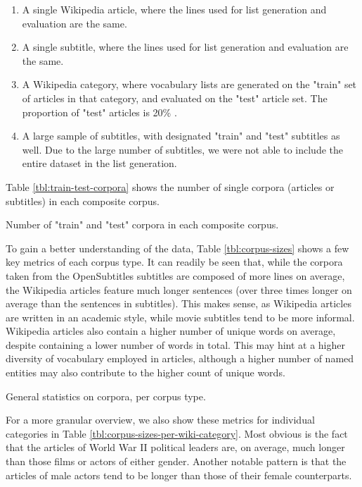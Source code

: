 \begin{enumerate}
	\item A single Wikipedia article, where the lines used for list generation and evaluation are the same.
	\item A single subtitle, where the lines used for list generation and evaluation are the same.
	\item A Wikipedia category, where vocabulary lists are generated on the "train" set of articles in that category, and evaluated on the "test" article set. The proportion of "test" articles is 20\% .
	\item A large sample of subtitles, with designated "train" and "test" subtitles as well. Due to the large number of subtitles, we were not able to include the entire dataset in the list generation.
\end{enumerate}

Table \ref{tbl:train-test-corpora} shows the number of single corpora (articles or subtitles) in each composite corpus.

\begin{table}[ht]
	\centering
	
	\caption{Number of "train" and "test" corpora in each composite corpus.}
	\label{tbl:train-test-corpora}
\end{table}


To gain a better understanding of the data, Table \ref{tbl:corpus-sizes} shows a few key metrics of each corpus type.
It can readily be seen that, while the corpora taken from the OpenSubtitles subtitles are composed of more lines on average, the Wikipedia articles feature much longer sentences (over three times longer on average than the sentences in subtitles).
This makes sense, as Wikipedia articles are written in an academic style, while movie subtitles tend to be more informal.
Wikipedia articles also contain a higher number of unique words on average, despite containing a lower number of words in total.
This may hint at a higher diversity of vocabulary employed in articles, although a higher number of named entities may also contribute to the higher count of unique words.

\begin{table}[ht]
	\centering
	
	\caption{General statistics on corpora, per corpus type.}
	\label{tbl:corpus-sizes}
\end{table}


For a more granular overview, we also show these metrics for individual categories in Table \ref{tbl:corpus-sizes-per-wiki-category}.
Most obvious is the fact that the articles of World War II political leaders are, on average, much longer than those films or actors of either gender.
Another notable pattern is that the articles of male actors tend to be longer than those of their female counterparts.


